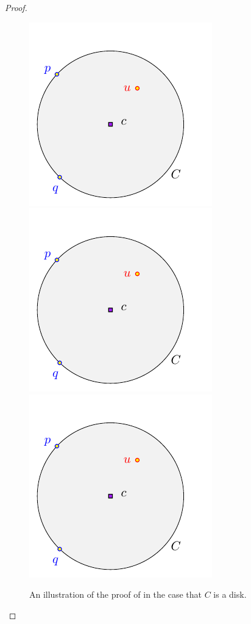 \begin{proof}
	\begin{figure}[h]
		\phantom{}\hfill%
		\includegraphics[page=1]{../figs/shrink}%
		\hfill%
		\includegraphics[page=2]{../figs/shrink}%
		\hfill%
		\includegraphics[page=3]{../figs/shrink}%
		\hfill%
		\phantom{}%
		\caption{An illustration of the proof of
			 in the case that $C$ is a disk.}
	\end{figure}
	

\end{proof}
